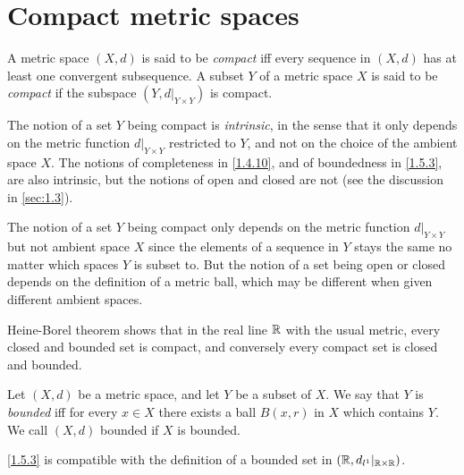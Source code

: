 \section{Compact metric spaces}\label{sec:1.5}

\begin{defn}[Compactness]\label{1.5.1}
  A metric space \((X, d)\) is said to be \emph{compact} iff every sequence in \((X, d)\) has at least one convergent subsequence.
  A subset \(Y\) of a metric space \(X\) is said to be \emph{compact} if the subspace \((Y, d|_{Y \times Y})\) is compact.
\end{defn}

\begin{rmk}\label{1.5.2}
  The notion of a set \(Y\) being compact is \emph{intrinsic}, in the sense that it only depends on the metric function \(d|_{Y \times Y}\) restricted to \(Y\), and not on the choice of the ambient space \(X\).
  The notions of completeness in \cref{1.4.10}, and of boundedness in \cref{1.5.3}, are also intrinsic, but the notions of open and closed are not
  (see the discussion in \cref{sec:1.3}).
\end{rmk}

\begin{note}
  The notion of a set \(Y\) being compact only depends on the metric function \(d|_{Y \times Y}\) but not ambient space \(X\) since the elements of a sequence in \(Y\) stays the same no matter which spaces \(Y\) is subset to.
  But the notion of a set being open or closed depends on the definition of a metric ball, which may be different when given different ambient spaces.
\end{note}

\begin{note}
  Heine-Borel theorem shows that in the real line \(\mathbb{R}\) with the usual metric, every closed and bounded set is compact, and conversely every compact set is closed and bounded.
\end{note}

\begin{defn}\label{1.5.3}
  Let \((X, d)\) be a metric space, and let \(Y\) be a subset of \(X\).
  We say that \(Y\) is \emph{bounded} iff for every \(x \in X\) there exists a ball \(B(x, r)\) in \(X\) which contains \(Y\).
  We call \((X, d)\) bounded if \(X\) is bounded.
\end{defn}

\begin{rmk}\label{1.5.4}
  \cref{1.5.3} is compatible with the definition of a bounded set in \((\mathbb{R}, d_{l^1}|_{\mathbb{R} \times \mathbb{R}})\).
\end{rmk}

